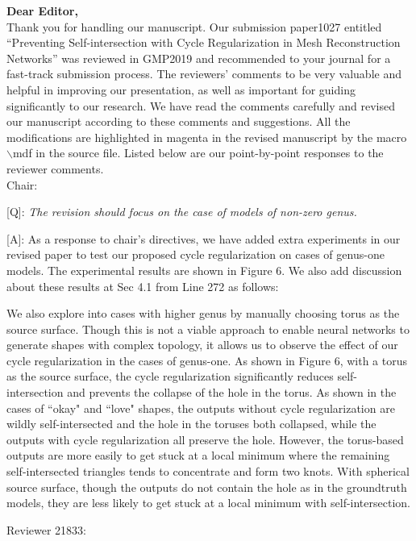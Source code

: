 \documentclass[10pt]{letter} %
\newcommand{\mdf}[1]{\textcolor[rgb]{1.00,0.00,1.00}{#1}}
\begin{document}
	\textbf{Dear Editor,}\\
	Thank you for handling our manuscript. Our submission paper1027 entitled ``Preventing Self-intersection with Cycle Regularization in Mesh
	Reconstruction Networks'' was reviewed in GMP2019 and recommended to your journal for a fast-track submission process. The reviewers’ comments to be very valuable and helpful in improving our presentation, as well as important for guiding significantly to our research. We have read the comments carefully and revised our manuscript according to these comments and suggestions. All the modifications are \mdf{highlighted in magenta} in the revised manuscript by the macro $\backslash$mdf in the source file. Listed below are our point-by-point responses to the reviewer comments.\\
	
	\hdashrule{\linewidth}{1pt}{1mm}
	Chair:
	
	[Q]: \emph{The revision should focus on the case of models of non-zero genus.}
	
	[A]: As a response to chair's directives, we have added extra experiments in our revised paper to test our proposed cycle regularization on cases of genus-one models. The experimental results are shown in Figure 6. We also add discussion about these results at Sec 4.1 from Line 272 as follows:
	 
	\mdf{We also explore into cases with higher genus by manually choosing torus as the source surface. Though this is not a viable approach to enable neural networks to generate shapes with complex topology, it allows us to observe the effect of our cycle regularization in the cases of genus-one. As shown in Figure 6, with a torus as the source surface, the cycle regularization significantly reduces self-intersection and prevents the collapse of the hole in the torus. As shown in the cases of ``okay" and ``love" shapes, the outputs without cycle regularization are wildly self-intersected and the hole in the toruses both collapsed, while the outputs with cycle regularization all preserve the hole.  However, the torus-based outputs are more easily to get stuck at a local minimum where the remaining self-intersected triangles tends to concentrate and form two knots. With spherical source surface, though the outputs do not contain the hole as in the groundtruth models, they are less likely to get stuck at a local minimum with self-intersection.
	}
	
	\hdashrule{\linewidth}{1pt}{1mm}
	Reviewer 21833:
	
\end{document}
